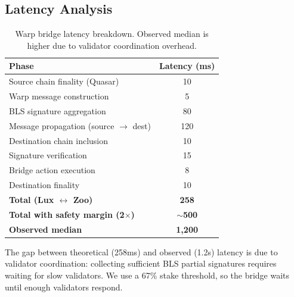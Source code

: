 \subsection{Latency Analysis}

\begin{table}[t]
\centering
\begin{tabular}{lc}
\toprule
\textbf{Phase} & \textbf{Latency (ms)} \\
\midrule
Source chain finality (Quasar) & 10 \\
Warp message construction & 5 \\
BLS signature aggregation & 80 \\
Message propagation (source $\to$ dest) & 120 \\
Destination chain inclusion & 10 \\
Signature verification & 15 \\
Bridge action execution & 8 \\
Destination finality & 10 \\
\midrule
\textbf{Total (Lux $\leftrightarrow$ Zoo)} & \textbf{258} \\
\textbf{Total with safety margin (2$\times$)} & \textbf{$\sim$500} \\
\textbf{Observed median} & \textbf{1,200} \\
\bottomrule
\end{tabular}
\caption{Warp bridge latency breakdown. Observed median is higher due to validator coordination overhead.}
\label{tab:warp-latency}
\end{table}

The gap between theoretical (258ms) and observed (1.2s) latency is due to validator coordination: collecting sufficient BLS partial signatures requires waiting for slow validators. We use a 67\% stake threshold, so the bridge waits until enough validators respond.

